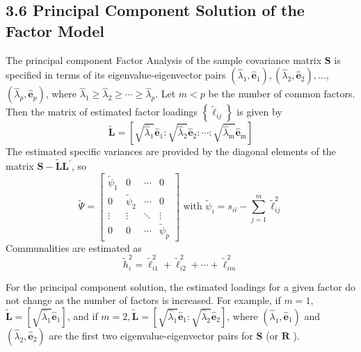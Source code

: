 \documentclass[12pt]{article}
\numberwithin{equation}{section}
\begin{document}
\subsection*{3.6 Principal Component Solution of the Factor Model}

The principal component Factor Analysis of the sample covariance matrix $\mathbf{S}$ is specified in terms of its eigenvalue-eigenvector pairs $\left(\hat{\lambda}_1, \hat{\mathbf{e}}_1\right),\left(\hat{\lambda}_2, \hat{\mathbf{e}}_2\right), \ldots$, $\left(\hat{\lambda}_p, \hat{\mathbf{e}}_p\right)$, where $\hat{\lambda}_1 \geq \hat{\lambda}_2 \geq \cdots \geq \hat{\lambda}_p$. Let $m<p$ be the number of common factors. Then the matrix of estimated factor loadings $\left\{\tilde{\ell}_{i j}\right\}$ is given by
\begin{equation}
	\tilde{\mathbf{L}}=\left[\sqrt{\hat{\lambda}_1} \hat{\mathbf{e}}_1: \sqrt{\hat{\lambda}_2} \hat{\mathbf{e}}_2: \cdots: \sqrt{\hat{\lambda}_{\mathrm{m}}} \hat{\mathbf{e}}_{\mathrm{m}}\right]
\end{equation}
The estimated specific variances are provided by the diagonal elements of the matrix $\mathbf{S}-\widetilde{\mathbf{L}} \mathbf{L}^{\prime}$, so
\begin{equation}
	\widetilde{\Psi}=\left[\begin{array}{cccc}
		\widetilde{\psi}_1 & 0 & \cdots & 0 \\
		0 & \widetilde{\psi}_2 & \cdots & 0 \\
		\vdots & \vdots & \ddots & \vdots \\
		0 & 0 & \cdots & \widetilde{\psi}_p
	\end{array}\right] \text { with } \widetilde{\psi}_i=s_{i i}-\sum_{j=1}^m \tilde{\ell}_{i j}^2
\end{equation}
Communalities are estimated as
\begin{equation}
	\widetilde{h}_i^2=\tilde{\ell}_{i 1}^2+\tilde{\ell}_{i 2}^2+\cdots+\tilde{\ell}_{i m}^2
\end{equation}

\noindent For the principal component solution, the estimated loadings for a given factor do not change as the number of factors is increased. For example, if $m=1$, $\tilde{\mathbf{L}}=\left[\sqrt{\hat{\lambda}_1} \hat{\mathbf{e}}_1\right]$, and if $m=2, \tilde{\mathbf{L}}=\left[\sqrt{\hat{\lambda}_1} \hat{\mathbf{e}}_1: \sqrt{\hat{\lambda}_2} \hat{\mathbf{e}}_2\right]$, where $\left(\hat{\lambda}_1, \hat{\mathbf{e}}_1\right)$ and $\left(\hat{\lambda}_2, \hat{\mathbf{e}}_2\right)$ are the first two eigenvalue-eigenvector pairs for $\mathbf{S}$ (or $\mathbf{R}$ ).
\end{document}
